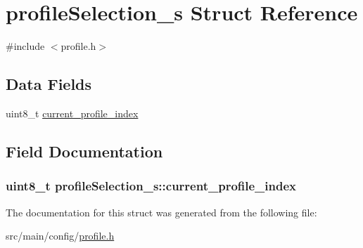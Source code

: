 \hypertarget{structprofileSelection__s}{\section{profile\+Selection\+\_\+s Struct Reference}
\label{structprofileSelection__s}
}


{\ttfamily \#include $<$profile.\+h$>$}

\subsection*{Data Fields}
\begin{DoxyCompactItemize}
\item 
uint8\+\_\+t \hyperlink{structprofileSelection__s_a64662687f8fa95462b5813ab956bd3c5}{current\+\_\+profile\+\_\+index}
\end{DoxyCompactItemize}


\subsection{Field Documentation}
\hypertarget{structprofileSelection__s_a64662687f8fa95462b5813ab956bd3c5}{
\subsubsection[{current\+\_\+profile\+\_\+index}]{\setlength{\rightskip}{0pt plus 5cm}uint8\+\_\+t profile\+Selection\+\_\+s\+::current\+\_\+profile\+\_\+index}}\label{structprofileSelection__s_a64662687f8fa95462b5813ab956bd3c5}


The documentation for this struct was generated from the following file\+:\begin{DoxyCompactItemize}
\item 
src/main/config/\hyperlink{profile_8h}{profile.\+h}\end{DoxyCompactItemize}
